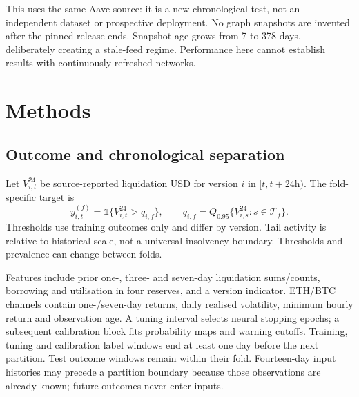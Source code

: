 \documentclass[
  10pt,
  a4paper,
]{article}
\begin{document}
This uses the same Aave source: it is a new chronological test, not an
independent dataset or prospective deployment. No graph snapshots are
invented after the pinned release ends. Snapshot age grows from 7 to 378
days, deliberately creating a stale-feed regime. Performance here cannot
establish results with continuously refreshed networks.

\section{Methods}\label{methods}

\subsection{Outcome and chronological
separation}\label{outcome-and-chronological-separation}

Let \(V_{i,t}^{24}\) be source-reported liquidation USD for version
\(i\) in \([t,t+24\mathrm{h})\). The fold-specific target is
\[y_{i,t}^{(f)}=\mathbb{1}\{V_{i,t}^{24}>q_{i,f}\},\qquad q_{i,f}=Q_{0.95}\{V_{i,s}^{24}:s\in\mathcal T_f\}.\]
Thresholds use training outcomes only and differ by version. Tail
activity is relative to historical scale, not a universal insolvency
boundary. Thresholds and prevalence can change between folds.

Features include prior one-, three- and seven-day liquidation
sums/counts, borrowing and utilisation in four reserves, and a version
indicator. ETH/BTC channels contain one-/seven-day returns, daily
realised volatility, minimum hourly return and observation age. A tuning
interval selects neural stopping epochs; a subsequent calibration block
fits probability maps and warning cutoffs. Training, tuning and
calibration label windows end at least one day before the next
partition. Test outcome windows remain within their fold. Fourteen-day
input histories may precede a partition boundary because those
observations are already known; future outcomes never enter inputs.
\end{document}
